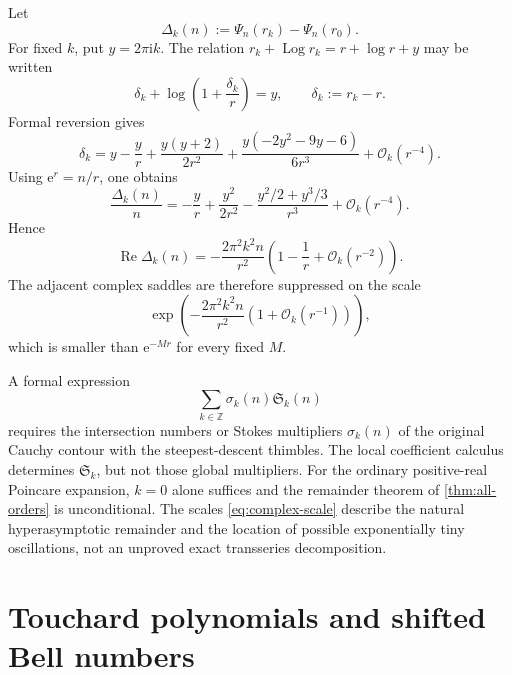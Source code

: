 \documentclass[11pt,a4paper]{article}
\theoremstyle{definition}
\theoremstyle{remark}
\newcommand{\ii}{\mathrm i}
\newcommand{\ee}{\mathrm e}
\newcommand{\BigO}{\mathcal O}
\DeclareMathOperator{\Log}{Log}
\DeclareMathOperator{\RePart}{Re}
\begin{document}
Let
\begin{equation}\label{eq:Delta-k}
 \Delta_k(n):=\Psi_n(r_k)-\Psi_n(r_0).
\end{equation}
For fixed \(k\), put \(y=2\pi\ii k\).  The relation
\(r_k+\Log r_k=r+\log r+y\) may be written
\begin{equation}\label{eq:delta-eq}
 \delta_k+\log\!\left(1+\frac{\delta_k}{r}\right)=y,
 \qquad \delta_k:=r_k-r.
\end{equation}
Formal reversion gives
\begin{equation}\label{eq:delta-expansion}
 \delta_k
 =y-\frac yr+\frac{y(y+2)}{2r^2}
 +\frac{y(-2y^2-9y-6)}{6r^3}+\BigO_k(r^{-4}).
\end{equation}
Using \(\ee^r=n/r\), one obtains
\begin{equation}\label{eq:action-expansion}
 \frac{\Delta_k(n)}n
 =-\frac yr+\frac{y^2}{2r^2}
 -\frac{y^2/2+y^3/3}{r^3}+\BigO_k(r^{-4}).
\end{equation}
Hence
\begin{equation}\label{eq:real-action-gap}
 \RePart\Delta_k(n)
 =-\frac{2\pi^2k^2n}{r^2}
   \left(1-\frac1r+\BigO_k(r^{-2})\right).
\end{equation}
The adjacent complex saddles are therefore suppressed on the scale
\begin{equation}\label{eq:complex-scale}
 \exp\!\left(-\frac{2\pi^2k^2n}{r^2}
              (1+\BigO_k(r^{-1}))\right),
\end{equation}
which is smaller than \(\ee^{-Mr}\) for every fixed \(M\).

\begin{auditbox}[title={Why no unconditional global saddle sum is asserted}]
A formal expression
\[
  \sum_{k\in\mathbb Z}\sigma_k(n)\mathfrak S_k(n)
\]
requires the intersection numbers or Stokes multipliers \(\sigma_k(n)\) of the
original Cauchy contour with the steepest-descent thimbles.  The local coefficient
calculus determines \(\mathfrak S_k\), but not those global multipliers.  For the
ordinary positive-real Poincare expansion, \(k=0\) alone suffices and the
remainder theorem of \cref{thm:all-orders} is unconditional.  The scales
\cref{eq:complex-scale} describe the natural hyperasymptotic remainder and the
location of possible exponentially tiny oscillations, not an unproved exact
transseries decomposition.
\end{auditbox}

\section{Touchard polynomials and shifted Bell numbers}\label{sec:touchard}
\end{document}

